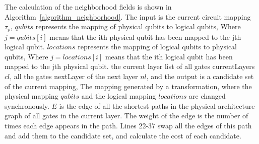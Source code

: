 \documentclass[runningheads]{llncs}
\begin{document}
The calculation of the neighborhood fields is shown in Algorithm~\ref{algorithm_neighborhood}. The input is the current circuit mapping $\tau_{p}$, $ qubits $ represents the mapping of physical qubits to logical qubits, Where $ j = qubits [i] $ means that the ith physical qubit has been mapped to the jth logical qubit. $ locations $ represents the mapping of logical qubits to physical qubits, Where $ j = locations [i] $ means that the ith logical qubit has been mapped to the jth physical qubit.
the current layer list of all gates currentLayers $cl$, all the gates nextLayer of the next layer $nl$, and the output is a candidate set of the current mapping, The mapping generated by a transformation, where the physical mapping $ qubits $   and the logical mapping $ locations $ are changed synchronously. $E$ is the edge of all the shortest paths in the physical architecture graph of all gates in the current layer. The weight of the edge is the number of times each edge appears in the path. Lines 22-37 swap all the edges of this path and add them to the candidate set, and calculate the cost of each candidate.
\end{document}
